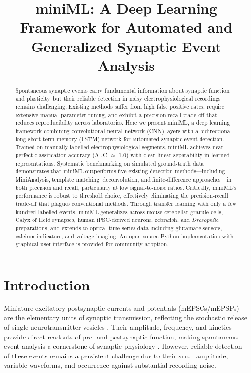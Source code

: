 \documentclass[11pt]{article}
\title{miniML: A Deep Learning Framework for Automated and Generalized Synaptic Event Analysis}
\author{}
\date{}
\begin{document}
\maketitle

\begin{abstract}
Spontaneous synaptic events carry fundamental information about synaptic function and plasticity, but their reliable detection in noisy electrophysiological recordings remains challenging. Existing methods suffer from high false positive rates, require extensive manual parameter tuning, and exhibit a precision-recall trade-off that reduces reproducibility across laboratories. Here we present miniML, a deep learning framework combining convolutional neural network (CNN) layers with a bidirectional long short-term memory (LSTM) network for automated synaptic event detection. Trained on manually labelled electrophysiological segments, miniML achieves near-perfect classification accuracy (AUC $\approx$ 1.0) with clear linear separability in learned representations. Systematic benchmarking on simulated ground-truth data demonstrates that miniML outperforms five existing detection methods---including MiniAnalysis, template matching, deconvolution, and finite-difference approaches---in both precision and recall, particularly at low signal-to-noise ratios. Critically, miniML's performance is robust to threshold choice, effectively eliminating the precision-recall trade-off that plagues conventional methods. Through transfer learning with only a few hundred labelled events, miniML generalizes across mouse cerebellar granule cells, Calyx of Held synapses, human iPSC-derived neurons, zebrafish, and \textit{Drosophila} preparations, and extends to optical time-series data including glutamate sensors, calcium indicators, and voltage imaging. An open-source Python implementation with graphical user interface is provided for community adoption.
\end{abstract}

\section{Introduction}

Miniature excitatory postsynaptic currents and potentials (mEPSCs/mEPSPs) are the elementary units of synaptic transmission, reflecting the stochastic release of single neurotransmitter vesicles \citep{katz1951spontaneous,fatt1952spontaneous}. Their amplitude, frequency, and kinetics provide direct readouts of pre- and postsynaptic function, making spontaneous event analysis a cornerstone of synaptic physiology \citep{bhatt2020types}. However, reliable detection of these events remains a persistent challenge due to their small amplitude, variable waveforms, and occurrence against substantial recording noise.
\end{document}
